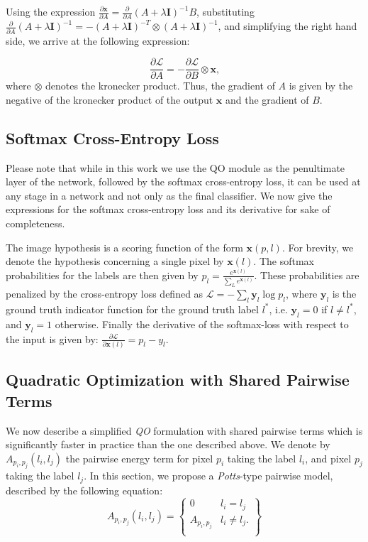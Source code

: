 \documentclass[runningheads]{llncs}
\begin{document}
Using the expression $ \frac{\partial \mathbf{x}}{\partial A} = \frac{\partial}{\partial A} (A + \lambda \mathbf{I} )^{-1} B $, substituting 
 $  \frac{\partial}{\partial A} (A + \lambda \mathbf{I} )^{-1} = - (A + \lambda \mathbf{I} )^{-T} \otimes (A + \lambda \mathbf{I} )^{-1}$,
 and simplifying the right hand side,
 we arrive at the following expression:
 
\begin{equation}
 \frac{\partial \mathcal{L}}{\partial A} = - \frac{\partial \mathcal{L}}{\partial B}  \otimes \mathbf{x}\text{,}
 \label{eqn:dlda2_1}
\end{equation}
where $\otimes$ denotes the kronecker product.
Thus, the gradient of $A$ is given by the negative of the kronecker product of the output $\textbf{x}$ and the gradient of $B$.

\subsection{Softmax Cross-Entropy Loss}
Please note that while in this work we use the QO module as the penultimate layer of the network, followed by the
softmax cross-entropy loss, it can be used at any stage in a network and not only as the final classifier.
We now give the expressions for the softmax cross-entropy loss and its derivative for sake of completeness.

The image hypothesis is a scoring function of the form $\mathbf{x}(p,l)$. For brevity, we denote the hypothesis concerning a single pixel by $\mathbf{x}(l)$.
The softmax probabilities for the labels are then given by 
$p_l = \frac{e^{\mathbf{x}(l)}}{\sum_L e^{\mathbf{x}(l)}}\text{.}$
These probabilities are penalized by the cross-entropy loss
defined as
$\mathcal{L} = -\sum_l \mathbf{y}_l \log p_l$, 
where $\mathbf{y}_l$ is the ground truth indicator function for the ground truth label $l^*$, i.e. $\mathbf{y}_l = 0$ if $l \neq l^*$, and $\mathbf{y}_l = 1$ otherwise.
Finally the derivative of the softmax-loss with respect to the input is given by:
$\frac{\partial \mathcal{L}}{\partial \mathbf{x}(l)} = p_l - y_l$.


\subsection{Quadratic Optimization with Shared Pairwise Terms}
\label{sec:simpleqo}
We now describe a simplified \emph{QO} formulation with shared pairwise terms which is significantly faster in practice than the one described above.
We denote by $A_{p_i,p_j}(l_i,l_j)$ the pairwise energy term for pixel $p_i$ taking the label $l_i$, and pixel $p_j$ taking the label $l_j$.
In this section, we propose a \emph{Potts}-type pairwise model, described by the following equation:
\begin{equation}
 A_{p_i,p_j}(l_i,l_j) = \left\{
\begin{array}{ll}
      0 & l_i = l_j \\
      A_{p_i,p_j} & l_i \neq l_j{.} \\
\end{array} 
\right\}
\end{equation}
\end{document}
